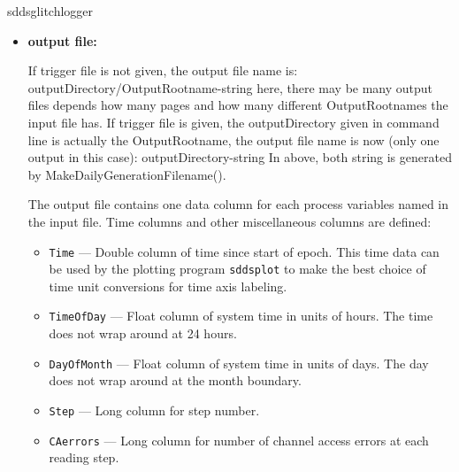 \begin{sddsprog}{sddsglitchlogger}
\begin{itemize}
  \item \textbf{output file:}\par
If trigger file is not given, the output file name is:
   outputDirectory/OutputRootname-string
   here, there may be many output files depends how many pages and how many different OutputRootnames
   the input file has.
If trigger file is given, the outputDirectory given in command line is actually the OutputRootname,
the output file name is now (only one output in this case):
   outputDirectory-string
In above, both string is generated by MakeDailyGenerationFilename().

The output file contains one data column for each process variables named in the input file.
Time columns and other miscellaneous columns are defined:
  \begin{itemize}
    \item {\tt Time} --- Double column of time since start of epoch. This time data can be used by
        the plotting program {\verb+sddsplot+} to make the best choice of time unit conversions
        for time axis labeling.
    \item {\tt TimeOfDay} --- Float column of system time in units of hours.
        The time does not wrap around at 24 hours.
    \item {\tt DayOfMonth} --- Float column of system time in units of days.
        The day does not wrap around at the month boundary.
    \item {\tt Step} --- Long column for step number.
    \item {\tt CAerrors} --- Long column for number of channel access errors at each reading step.
  \end{itemize}


\end{itemize}
\end{sddsprog}
